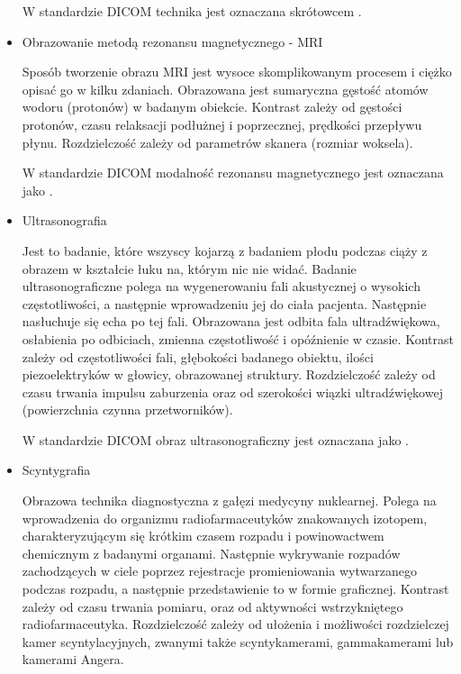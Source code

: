 \begin{itemize}
    W standardzie DICOM technika jest oznaczana skrótowcem .

    \item Obrazowanie metodą rezonansu magnetycznego - MRI

    Sposób tworzenie obrazu MRI jest wysoce skomplikowanym procesem i ciężko opisać go w kilku zdaniach.
		Obrazowana jest sumaryczna gęstość atomów wodoru (protonów) w badanym obiekcie.
    Kontrast zależy od gęstości protonów, czasu relaksacji podłużnej i poprzecznej, prędkości przepływu płynu.
		Rozdzielczość zależy od parametrów skanera (rozmiar woksela).
    
    W standardzie DICOM modalność rezonansu magnetycznego jest oznaczana jako .
    
    \item Ultrasonografia
    
    Jest to badanie, które wszyscy kojarzą z badaniem płodu podczas ciąży z obrazem w kształcie łuku na, którym nic nie widać. 
    Badanie ultrasonograficzne polega na wygenerowaniu fali akustycznej o wysokich częstotliwości, a następnie wprowadzeniu jej do ciała pacjenta. 
    Następnie nasłuchuje się echa po tej fali.
    Obrazowana jest odbita fala ultradźwiękowa, osłabienia po odbiciach, zmienna częstotliwość i opóźnienie w czasie.
    Kontrast zależy od częstotliwości fali, głębokości badanego obiektu, ilości piezoelektryków w głowicy, obrazowanej struktury.
    Rozdzielczość zależy od czasu trwania impulsu zaburzenia oraz od szerokości wiązki ultradźwiękowej (powierzchnia czynna przetworników).

    W standardzie DICOM obraz ultrasonograficzny jest oznaczana jako .

    \item Scyntygrafia
    
    Obrazowa technika diagnostyczna z gałęzi medycyny nuklearnej.
    Polega na wprowadzenia do organizmu  radiofarmaceutyków znakowanych izotopem, charakteryzującym się krótkim czasem rozpadu i powinowactwem chemicznym z badanymi organami.
    Następnie wykrywanie rozpadów zachodzących w ciele poprzez rejestracje promieniowania wytwarzanego podczas rozpadu, a następnie przedstawienie to w formie graficznej. 
    Kontrast zależy od czasu trwania pomiaru, oraz od aktywności wstrzykniętego radiofarmaceutyka.
    Rozdzielczość zależy od ułożenia  i możliwości rozdzielczej  kamer scyntylacyjnych, zwanymi także scyntykamerami, gammakamerami lub kamerami Angera.


\end{itemize}
